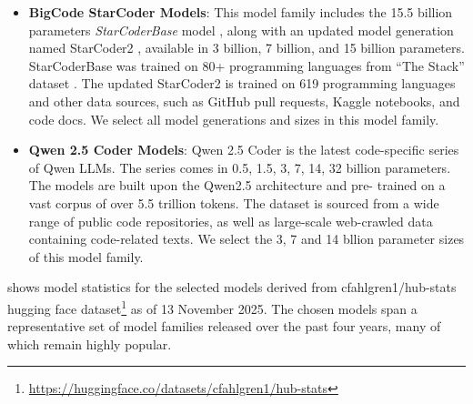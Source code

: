 \documentclass[12pt]{book}
\begin{document}
\begin{itemize}
\item \textbf{BigCode StarCoder Models}: This model family includes the 15.5 billion parameters \textit{StarCoderBase} model \citep{li2023starcoder}, along with an updated model generation named StarCoder2 \citep{Lozhkov2024StarCoder2A}, available in 3 billion, 7 billion, and 15 billion parameters. StarCoderBase was trained on 80+ programming languages from ``The Stack'' dataset \citep{Kocetkov2022TheStack}. The updated StarCoder2 is trained on 619 programming languages and other data sources, such as GitHub pull requests, Kaggle notebooks, and code docs. We select all model generations and sizes in this model family. 

\item \textbf{Qwen 2.5 Coder Models}: Qwen 2.5 Coder \citep{hui2024qwen} is the latest code-specific series of Qwen LLMs. The series comes in 0.5, 1.5, 3, 7, 14, 32 billion parameters. The models are built upon the Qwen2.5 architecture and pre-
trained on a vast corpus of over 5.5 trillion tokens. The dataset is sourced from a wide range of public code repositories, as well as large-scale web-crawled data containing code-related texts. We select the 3, 7 and 14 bllion parameter sizes of this model family. 
\end{itemize}

 shows model statistics for the selected models derived from cfahlgren1/hub-stats hugging face dataset\footnote{\url{https://huggingface.co/datasets/cfahlgren1/hub-stats}} as of 13 November 2025. The chosen models span a representative set of model families released over the past four years, many of which remain highly popular.
\end{document}
